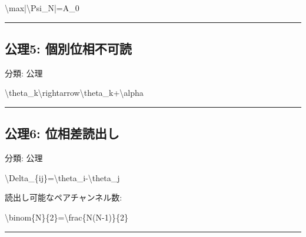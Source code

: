 \documentclass[
  a4paper,
]{ltjsarticle}
\newenvironment{Shaded}{}{}
\newcommand{\NormalTok}[1]{#1}
\begin{document}
\begin{Shaded}
\begin{Highlighting}[]
\NormalTok{\textbackslash{}max|\textbackslash{}Psi\_N|=A\_0}
\end{Highlighting}
\end{Shaded}

\begin{center}\rule{0.5\linewidth}{0.5pt}\end{center}

\subsection{公理5:
個別位相不可読}\label{ux516cux74065-ux500bux5225ux4f4dux76f8ux4e0dux53efux8aad}

分類: 公理

\begin{Shaded}
\begin{Highlighting}[]
\NormalTok{\textbackslash{}theta\_k\textbackslash{}rightarrow\textbackslash{}theta\_k+\textbackslash{}alpha}
\end{Highlighting}
\end{Shaded}

\begin{center}\rule{0.5\linewidth}{0.5pt}\end{center}

\subsection{公理6:
位相差読出し}\label{ux516cux74066-ux4f4dux76f8ux5deeux8aadux51faux3057}

分類: 公理

\begin{Shaded}
\begin{Highlighting}[]
\NormalTok{\textbackslash{}Delta\_\{ij\}=\textbackslash{}theta\_i{-}\textbackslash{}theta\_j}
\end{Highlighting}
\end{Shaded}

読出し可能なペアチャンネル数:

\begin{Shaded}
\begin{Highlighting}[]
\NormalTok{\textbackslash{}binom\{N\}\{2\}=\textbackslash{}frac\{N(N{-}1)\}\{2\}}
\end{Highlighting}
\end{Shaded}

\begin{center}\rule{0.5\linewidth}{0.5pt}\end{center}
\end{document}

